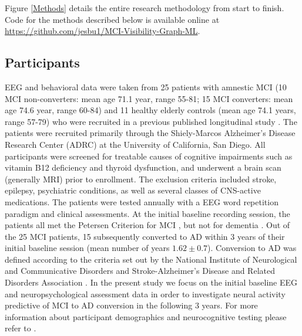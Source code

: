 \documentclass[Afour,times,sageh]{sagej}
\begin{document}
 Figure \ref{Methods} details the entire research methodology from start to finish.
 Code for the methods described below is available online at \href{https://github.com/jesbu1/MCI-Visibility-Graph-ML}{https://github.com/jesbu1/MCI-Visibility-Graph-ML}.
 \subsection{Participants}
 EEG and behavioral data were taken from 25 patients with amnestic MCI (10 MCI non-converters: mean age 71.1 year, range 55-81; 15 MCI converters: mean age 74.6 year, range 60-84) and 11 healthy elderly controls (mean age 74.1 years, range 57-79) who were recruited in a previous published longitudinal study \citep{OlchneyP600}. The patients were recruited primarily through the Shiely-Marcos Alzheimer’s Disease Research Center (ADRC) at the University of California, San Diego. All participants were screened for treatable causes of cognitive impairments such as vitamin B12 deficiency and thyroid dysfunction, and underwent a brain scan (generally MRI) prior to enrollment. The exclusion criteria included stroke, epilepsy, psychiatric conditions, as well as several classes of CNS-active medications. 
The patients were tested annually with a EEG word repetition paradigm and clinical assessments. At the initial baseline recording session, the patients all met the Petersen Criterion for MCI \citep{PetersonMCI}, but not for dementia \citep{APA}. Out of the 25 MCI patients, 15 subsequently converted to AD within 3 years of their initial baseline session (mean number of years $1.62 \pm 0.7$). Conversion to AD was defined according to the criteria set out by the National Institute of Neurological and Communicative Disorders and Stroke-Alzheimer’s Disease and Related Disorders Association \citep{McKhann}. In the present study we focus on the initial baseline EEG and neuropsychological assessment data in order to investigate neural activity predictive of MCI to AD conversion in the following 3 years. For more information about participant demographics and neurocognitive testing please refer to \citet{OlichneyN400}.
\end{document}

